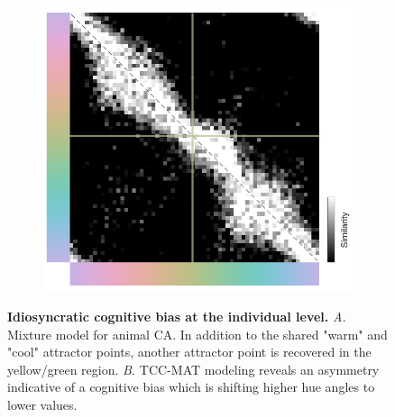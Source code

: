 \begin{figure}
    \centering
    \begin{subfigure}[t]{0.49\textwidth}
         \centering
         \caption{}
         
         \label{fig:CastorMM}
    \end{subfigure}
    \hfill
    \begin{subfigure}[t]{0.49\textwidth}
         \centering
         \caption{}
         \includegraphics[width=\textwidth]{../Figures/working/F5_CastorCogBias/sm_18_231110-202911.png}
         \label{fig:Castor-FreeSimilarity}
    \end{subfigure}
    \caption{\textbf{Idiosyncratic cognitive bias at the individual level.} 
    \emph{A.} Mixture model for animal CA. In addition to the shared "warm" and "cool" attractor points, another attractor point is recovered in the yellow/green region.
    \emph{B.} TCC-MAT modeling reveals an asymmetry indicative of a cognitive bias which is shifting higher hue angles to lower values.}
    \label{fig:IndiDataCogBias}
\end{figure}

